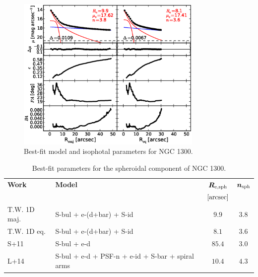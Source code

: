 \documentclass[preprint2]{emulateapj}
\newcommand{\fitfigurewidth}{0.8\textwidth}
\begin{document}
  \begin{figure}[h]
  \begin{center}
  \includegraphics[width=\fitfigurewidth]{images/n1300_1Dfit.eps}
  \caption{Best-fit model and isophotal parameters for NGC 1300.}
  \end{center}
  \end{figure}

  \begin{table}[h]
  \small
  \caption{Best-fit parameters for the spheroidal component of NGC 1300.}
  \begin{center}
  \begin{tabular}{llcc}
  \hline
  {\bf Work} & {\bf Model}   & $\bm R_{\rm e,sph}$    & $\bm n_{\rm sph}$ \\
    &  &  $[\rm arcsec]$ & \\
  \hline
  T.W. 1D maj. & S-bul + e-(d+bar) + S-id & $9.9$  &  $3.8$ \\
  T.W. 1D eq.  & S-bul + e-(d+bar) + S-id & $8.1$  &  $3.6$ \\
  \hline
  S+11    & S-bul + e-d & $85.4$  &  $3.0$ \\
  L+14    & S-bul + e-d + PSF-n + e-id + S-bar + spiral arms & $10.4$  &  $4.3$ \\
  \hline
  \end{tabular}
  \end{center}
  \label{tab:n1300}
  \end{table}
\end{document}
